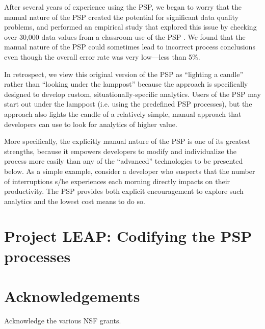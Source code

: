 \documentclass[]{article}
\begin{document}
After several years of experience using the PSP, we began to worry that the manual nature
of the PSP created the potential for significant data quality problems, and performed an
empirical study that explored this issue by checking over 30,000 data values from a
classroom use of the PSP \cite{csdl-98-11}. We found that the manual nature of the PSP could
sometimes lead to incorrect process conclusions even though the overall error rate was
very low---less than 5\%. 

In retrospect, we view this original version of the PSP as ``lighting a candle'' rather
than ``looking under the lamppost'' because the approach is specifically designed to
develop custom, situationally-specific analytics. Users of the PSP may start out under the
lamppost (i.e. using the predefined PSP processes), but the approach also lights the
candle of a relatively simple, manual approach that developers can use to look for
analytics of higher value.

More specifically, the explicitly manual nature of the PSP is one of its greatest strengths,
because it empowers developers to modify and individualize the process more easily than
any of the ``advanced'' technologies to be presented below. As a simple example, consider
a developer who suspects that the number of interruptions s/he experiences each morning
directly impacts on their productivity.  The PSP provides both explicit encouragement to
explore such analytics and the lowest cost means to do so. 

\section{Project LEAP: Codifying the PSP processes} 







\section{Acknowledgements}

Acknowledge the various NSF grants. 



\end{document}

